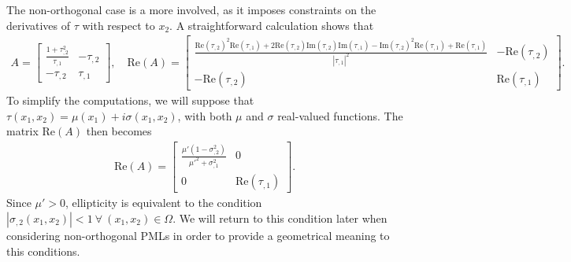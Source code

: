\documentclass[11pt]{article}
\begin{document}
The non-orthogonal case is a more involved, as it imposes constraints on the
derivatives of $\tau$ with respect to $x_2$. A straightforward calculation shows
that 
\begin{align}
  A = 
  \begin{bmatrix}
    \frac{1 + \tau_{,2}^2}{\tau_{,1}} & -\tau_{,2} \\
    -\tau_{,2} & \tau_{,1}
  \end{bmatrix}, \quad
  \mathrm{Re}(A) = 
  \begin{bmatrix}
    \frac{\mathrm{Re}(\tau_{,2})^2 \mathrm{Re}(\tau_{,1}) + 2 \mathrm{Re}(\tau_{,2}) \mathrm{Im}(\tau_{,2}) \mathrm{Im}(\tau_{,1}) - \mathrm{Im}(\tau_{,2}) ^2 \mathrm{Re}(\tau_{,1}) + \mathrm{Re}(\tau_{,1})}{|\tau_{,1}|^2} & -\mathrm{Re}(\tau_{,2}) \\
    -\mathrm{Re}(\tau_{,2}) & \mathrm{Re}(\tau_{,1})
  \end{bmatrix}.
\end{align}
To simplify the computations, we will suppose that $\tau(x_1,x_2) = \mu(x_1) + i \sigma(x_1,x_2)$, with both
$\mu$ and $\sigma$ real-valued functions. The matrix $\mathrm{Re}(A)$ then becomes
\begin{align}  
  \mathrm{Re}(A) = 
  \begin{bmatrix}
    \frac{\mu'(1-\sigma_{,2}^2)}{\mu'^2 + \sigma_{,1}^2} & 0 \\
    0 & \mathrm{Re}(\tau_{,1})
  \end{bmatrix}.
\end{align}
Since $\mu' > 0$, ellipticity is equivalent to the condition $|\sigma_{,2}(x_1,x_2)| <
1 \ \forall \ (x_1,x_2)  \in \Omega$. We will return to this condition later
when considering non-orthogonal PMLs in order to provide a geometrical meaning
to this conditions.
\end{document}
